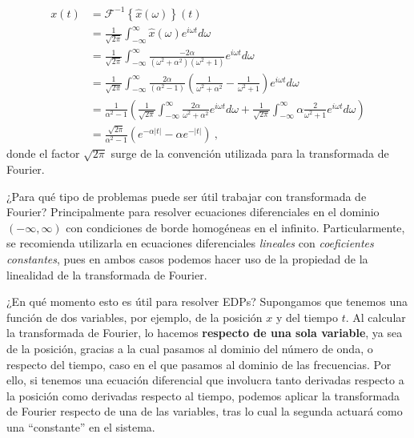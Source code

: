 \begin{ejemplo}
    \begin{align}
        x(t) & = \mathcal{F}^{-1} \left\{ \hat{x}(\omega) \right\} (t) \nonumber \\
        & = \frac{1}{\sqrt{2\pi}} \int_{-\infty}^\infty \hat{x}(\omega) e^{i\omega t} d\omega \nonumber \\
        & = \frac{1}{\sqrt{2\pi}} \int_{-\infty}^\infty \frac{-2\alpha}{(\omega^2 + \alpha^2) (\omega^2 + 1)} e^{i\omega t} d\omega \nonumber \\
        & = \frac{1}{\sqrt{2\pi}} \int_{-\infty}^\infty \frac{2\alpha}{(\alpha^2 - 1)} \left( \frac{1}{\omega^2 + \alpha^2} - \frac{1}{\omega^2 + 1} \right) e^{i\omega t} d\omega \nonumber \\
        & = \frac{1}{\alpha^2 - 1} \left( \frac{1}{\sqrt{2\pi}} \int_{-\infty}^\infty \frac{2\alpha}{\omega^2 + \alpha^2} e^{i\omega t} d\omega + \frac{1}{\sqrt{2\pi}} \int_{-\infty}^\infty \alpha \frac{2}{\omega^2 + 1} e^{i\omega t} d\omega \right) \nonumber \\
        & = \frac{\sqrt{2\pi}}{\alpha^2-1} \left( e^{-\alpha |t|} - \alpha e^{-|t|} \right)\ ,
    \end{align}
    donde el factor $\sqrt{2\pi}$ surge de la convención utilizada para la transformada de Fourier.
\end{ejemplo}

¿Para qué tipo de problemas puede ser útil trabajar con transformada de Fourier? Principalmente para resolver ecuaciones diferenciales en el dominio $(-\infty, \infty)$ con condiciones de borde homogéneas en el infinito. Particularmente, se recomienda utilizarla en ecuaciones diferenciales \emph{lineales} con \emph{coeficientes constantes}, pues en ambos casos podemos hacer uso de la propiedad de la linealidad de la transformada de Fourier.

¿En qué momento esto es útil para resolver EDPs? Supongamos que tenemos una función de dos variables, por ejemplo, de la posición $x$ y del tiempo $t$. Al calcular la transformada de Fourier, lo hacemos \textbf{respecto de una sola variable}, ya sea de la posición, gracias a la cual pasamos al dominio del número de onda, o respecto del tiempo, caso en el que pasamos al dominio de las frecuencias. Por ello, si tenemos una ecuación diferencial que involucra tanto derivadas respecto a la posición como derivadas respecto al tiempo, podemos aplicar la transformada de Fourier respecto de una de las variables, tras lo cual la segunda actuará como una ``constante'' en el sistema.

